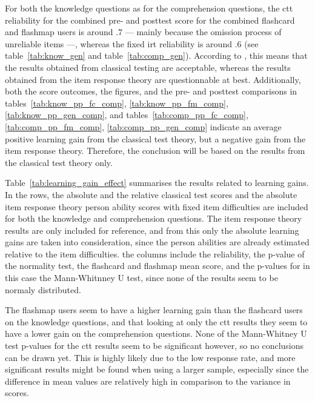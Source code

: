 For both the knowledge questions as for the comprehension questions, the ctt reliability for the combined pre- and posttest score for the combined flashcard and flashmap users is around .7 --- mainly because the omission process of unreliable items ---, whereas the fixed irt reliability is around .6 (see table~\ref{tab:know_gen} and table~\ref{tab:comp_gen}). According to , this means that the results obtained from classical testing are acceptable, whereas the results obtained from the item response theory are questionnable at best. Additionally, both the score outcomes, the figures, and the pre- and posttest comparisons in tables~\ref{tab:know_pp_fc_comp}, \ref{tab:know_pp_fm_comp}, \ref{tab:know_pp_gen_comp}, and tables~\ref{tab:comp_pp_fc_comp}, \ref{tab:comp_pp_fm_comp}, \ref{tab:comp_pp_gen_comp} indicate an average positive learning gain from the classical test theory, but a negative gain from the item response theory. Therefore, the conclusion will be based on the results from the classical test theory only.

Table~\ref{tab:learning_gain_effect} summarises the results related to learning gains. In the rows, the absolute and the relative classical test scores and the absolute item response theory person ability scores with fixed item difficulties are included for both the knowledge and comprehension questions. The item response theory results are only included for reference, and from this only the absolute learning gains are taken into consideration, since the person abilities are already estimated relative to the item difficulties. the columns include the reliability, the p-value of the normality test, the flashcard and flashmap mean score, and the p-values for in this case the Mann-Whitnney U test, since none of the results seem to be normaly distributed.

The flashmap users seem to have a higher learning gain than the flashcard users on the knowledge questions, and that looking at only the ctt results they seem to have a lower gain on the comprehension questions. None of the Mann-Whitney U test p-values for the ctt results seem to be significant however, so no conclusions can be drawn yet. This is highly likely due to the low response rate, and more significant results might be found when using a larger sample, especially since the difference in mean values are relatively high in comparison to the variance in scores.

